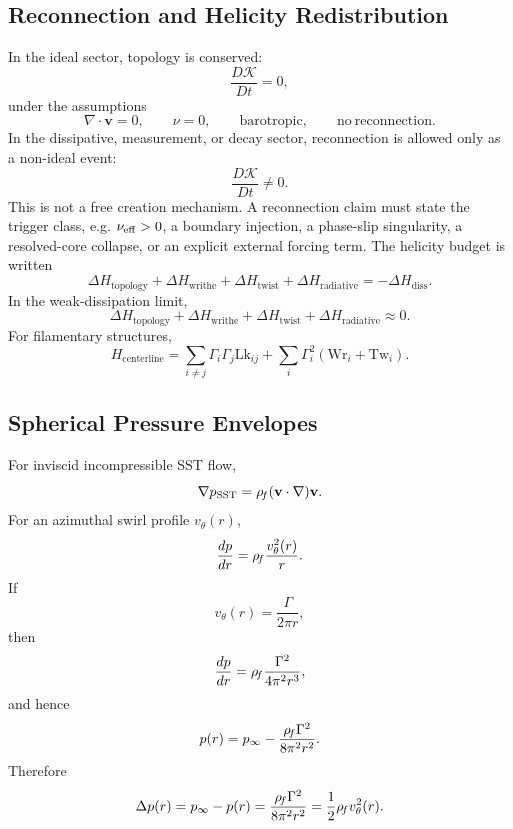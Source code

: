     \subsection{Reconnection and Helicity Redistribution}
        
        In the ideal sector, topology is conserved:
        \[
            \frac{D\mathcal K}{Dt}=0,
        \]
        under the assumptions
        \[
            \nabla\cdot\mathbf v=0,
            \qquad
            \nu=0,
            \qquad
            \mathrm{barotropic},
            \qquad
            \mathrm{no\ reconnection}.
        \]
        In the dissipative, measurement, or decay sector, reconnection is allowed only as a non-ideal event:
        \[
            \frac{D\mathcal K}{Dt}\neq0.
        \]
        This is not a free creation mechanism. A reconnection claim must state the trigger class, e.g. \(\nu_{\rm eff}>0\), a boundary injection, a phase-slip singularity, a resolved-core collapse, or an explicit external forcing term.
        The helicity budget is written
        \[
            \Delta H_{\mathrm{topology}}
            +
            \Delta H_{\mathrm{writhe}}
            +
            \Delta H_{\mathrm{twist}}
            +
            \Delta H_{\mathrm{radiative}}
            =
            -\Delta H_{\mathrm{diss}}.
        \]
        In the weak-dissipation limit,
        \[
            \Delta H_{\mathrm{topology}}
            +
            \Delta H_{\mathrm{writhe}}
            +
            \Delta H_{\mathrm{twist}}
            +
            \Delta H_{\mathrm{radiative}}
            \approx
            0.
        \]
        For filamentary structures,
        \[
            H_{\mathrm{centerline}}
            =
            \sum_{i\neq j}
            \Gamma_i\Gamma_j\mathrm{Lk}_{ij}
            +
            \sum_i
            \Gamma_i^2
            \left(
                \mathrm{Wr}_i+\mathrm{Tw}_i
            \right).
        \]
    
    \subsection{Spherical Pressure Envelopes}
        
        For inviscid incompressible SST flow,
        \[
            \nabla p_{\mathrm{SST}}
            =
            \rho_{\!f}(\mathbf v\cdot\nabla)\mathbf v .
        \]
        For an azimuthal swirl profile \(v_\theta(r)\),
        \[
            \frac{dp}{dr}
            =
            \rho_{\!f}\frac{v_\theta^2(r)}{r}.
        \]
        If
        \[
            v_\theta(r)=\frac{\Gamma}{2\pi r},
        \]
        then
        \[
            \frac{dp}{dr}
            =
            \rho_{\!f}\frac{\Gamma^2}{4\pi^2r^3},
        \]
        and hence
        \[
            p(r)
            =
            p_\infty
            -
            \frac{\rho_{\!f}\Gamma^2}{8\pi^2r^2}.
        \]
        Therefore
        \[
            \Delta p(r)
            =
            p_\infty-p(r)
            =
            \frac{\rho_{\!f}\Gamma^2}{8\pi^2r^2}
            =
            \frac{1}{2}\rho_{\!f} v_\theta^2(r).
        \]
        
